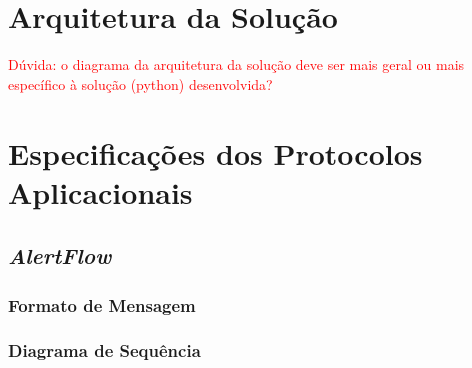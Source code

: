 \documentclass[a4paper,12pt]{scrreprt}
\begin{document}
\tableofcontents
\pagebreak

\listoffigures
\pagebreak

\listoftables
\pagebreak

\lstlistoflistings
\pagebreak




\chapter{Arquitetura da Solução}

\textcolor{red}{
    Dúvida: o diagrama da arquitetura da solução deve ser
    mais geral ou mais específico à solução (python) desenvolvida?
}



\chapter{Especificações dos Protocolos Aplicacionais}

\section{\textit{AlertFlow}}

\subsection{Formato de Mensagem}

\subsection{Diagrama de Sequência}
\end{document}
